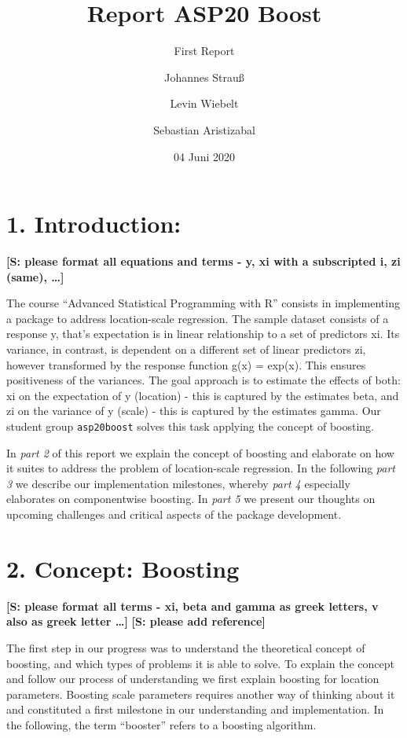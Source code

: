\documentclass[
]{report}
\title{Report ASP20 Boost}
\subtitle{First Report}
\author{Johannes Strauß \and Levin Wiebelt \and Sebastian Aristizabal}
\date{04 Juni 2020}
\begin{document}
\maketitle

{
\setcounter{tocdepth}{1}
\tableofcontents
}
\hypertarget{introduction}{%
\chapter{1. Introduction:}\label{introduction}}

\textbf{{[}S: please format all equations and terms - y, xi with a
subscripted i, zi (same), \ldots{]}}

The course ``Advanced Statistical Programming with R'' consists in
implementing a package to address location-scale regression. The sample
dataset consists of a response y, that's expectation is in linear
relationship to a set of predictors xi. Its variance, in contrast, is
dependent on a different set of linear predictors zi, however
transformed by the response function g(x) = exp(x). This ensures
positiveness of the variances. The goal approach is to estimate the
effects of both: xi on the expectation of y (location) - this is
captured by the estimates beta, and zi on the variance of y (scale) -
this is captured by the estimates gamma. Our student group
\texttt{asp20boost} solves this task applying the concept of boosting.

In \emph{part 2} of this report we explain the concept of boosting and
elaborate on how it suites to address the problem of location-scale
regression. In the following \emph{part 3} we describe our
implementation milestones, whereby \emph{part 4} especially elaborates
on componentwise boosting. In \emph{part 5} we present our thoughts on
upcoming challenges and critical aspects of the package development.

\hypertarget{concept-boosting}{%
\chapter{2. Concept: Boosting}\label{concept-boosting}}

\textbf{{[}S: please format all terms - xi, beta and gamma as greek
letters, v also as greek letter \ldots{]}} \textbf{{[}S: please add
reference{]}}

The first step in our progress was to understand the theoretical concept
of boosting, and which types of problems it is able to solve. To explain
the concept and follow our process of understanding we first explain
boosting for location parameters. Boosting scale parameters requires
another way of thinking about it and constituted a first milestone in
our understanding and implementation. In the following, the term
``booster'' refers to a boosting algorithm.
\end{document}

